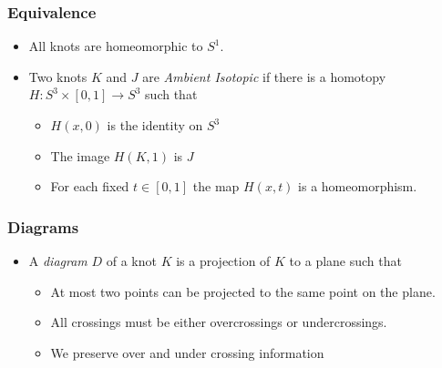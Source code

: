\documentclass{beamer}
\begin{document}
\begin{frame}
  \frametitle{Equivalence}
  \begin{itemize}
  \item All knots are homeomorphic to $S^1$.
    \pause
  \item Two knots $K$ and $J$ are \textit{Ambient Isotopic}
    if there is a homotopy $H:S^3\times[0,1]\rightarrow S^3$ such that
    \begin{itemize}
      \pause
    \item $H(x,0)$ is the identity on $S^3$
      \pause
    \item The image $H(K,1)$ is $J$
      \pause
    \item For each fixed $t\in[0,1]$ the map $H(x,t)$ is a
      homeomorphism.
    \end{itemize}
  \end{itemize}
\end{frame}

\begin{frame}
  \frametitle{Diagrams}
  \begin{itemize}
  \item A \textit{diagram} $D$ of a knot $K$ is a projection of
    $K$ to a plane such that
    \begin{itemize}
      \pause
    \item At most two points can be projected to the same point on the plane.
      \pause
    \item All crossings must be either overcrossings or undercrossings.
      \pause
    \item We preserve over and under crossing information      
    \end{itemize}
    \begin{center}
    \end{center}
  \end{itemize}
\end{frame}
\end{document}
